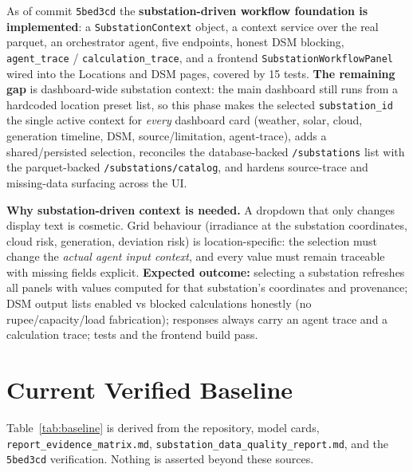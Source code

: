 \documentclass[11pt,a4paper]{article}
\newcommand{\code}[1]{\texttt{\small #1}}
\begin{document}
As of commit \code{5bed3cd} the \textbf{substation-driven workflow foundation is implemented}:
a \code{SubstationContext} object, a context service over the real parquet, an orchestrator
agent, five endpoints, honest DSM blocking, \code{agent\_trace} / \code{calculation\_trace}, and
a frontend \code{SubstationWorkflowPanel} wired into the Locations and DSM pages, covered by 15
tests. \textbf{The remaining gap} is dashboard-wide substation context: the main dashboard still
runs from a hardcoded location preset list, so this phase makes the selected \code{substation\_id}
the single active context for \emph{every} dashboard card (weather, solar, cloud, generation
timeline, DSM, source/limitation, agent-trace), adds a shared/persisted selection, reconciles the
database-backed \code{/substations} list with the parquet-backed \code{/substations/catalog}, and
hardens source-trace and missing-data surfacing across the UI.

\textbf{Why substation-driven context is needed.} A dropdown that only changes display text is
cosmetic. Grid behaviour (irradiance at the substation coordinates, cloud risk, generation,
deviation risk) is location-specific: the selection must change the \emph{actual agent input
context}, and every value must remain traceable with missing fields explicit. \textbf{Expected
outcome:} selecting a substation refreshes all panels with values computed for that substation's
coordinates and provenance; DSM output lists enabled vs blocked calculations honestly (no
rupee/capacity/load fabrication); responses always carry an agent trace and a calculation trace;
tests and the frontend build pass.

\section{Current Verified Baseline}
Table~\ref{tab:baseline} is derived from the repository, model cards,
\code{report\_evidence\_matrix.md}, \code{substation\_data\_quality\_report.md}, and the
\code{5bed3cd} verification. Nothing is asserted beyond these sources.
\end{document}

